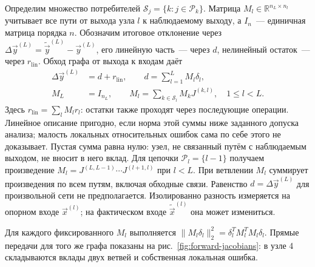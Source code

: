 Определим множество потребителей $\mathcal{S}_j=\{k:j\in\mathcal{P}_k\}$.
Матрица $M_l\in\mathbb{R}^{n_L\times n_l}$ учитывает все пути
от выхода узла $l$ к наблюдаемому выходу, а $I_n$~--- единичная
матрица порядка $n$. Обозначим итоговое отклонение через
$\Delta\Vec{y}^{(L)}=\widetilde{\Vec{y}}^{(L)}-\Vec{y}^{(L)}$,
его линейную часть~--- через $d$, нелинейный остаток~--- через $r_{\mathrm{lin}}$.
Обход графа от выхода к входам даёт
\begin{equation}
    \label{eq:accum}
    \begin{aligned}
        \Delta\Vec{y}^{(L)}&=d+r_{\mathrm{lin}},\qquad
        d=\sum_{l=1}^{L}M_l\delta_l,\\
        M_L&=I_{n_L},\qquad
        M_l=\sum_{k\in\mathcal{S}_l}M_kJ^{(k,l)},\quad 1\le l<L.
    \end{aligned}
\end{equation}
Здесь $r_{\mathrm{lin}}=\sum_l M_l r_l$: остатки также проходят
через последующие операции. Линейное описание пригодно, если норма этой суммы
ниже заданного допуска анализа; малость локальных относительных ошибок
сама по себе этого не доказывает.
Пустая сумма равна нулю: узел, не связанный путём с наблюдаемым
выходом, не вносит в него вклад. Для цепочки
$\mathcal{P}_l=\{l-1\}$ получаем произведение
$M_l=J^{(L,L-1)}\cdots J^{(l+1,l)}$ при $l<L$.
При ветвлении $M_l$ суммирует произведения по всем путям,
включая обходные связи.
Равенство $d=\Delta\Vec{y}^{(L)}$ для произвольной сети не предполагается.
Изолированно разность измеряется на опорном входе $\Vec{x}^{(l)}$;
на фактическом входе $\widetilde{\Vec{x}}^{(l)}$ она может измениться.

Для каждого фиксированного $M_l$ выполняется
$\|M_l\delta_l\|_2^2=\delta_l^TM_l^TM_l\delta_l$.
Прямые передачи для того же графа показаны на рис.~\ref{fig:forward-jacobians}:
в узле 4 складываются вклады двух ветвей и собственная локальная ошибка.

